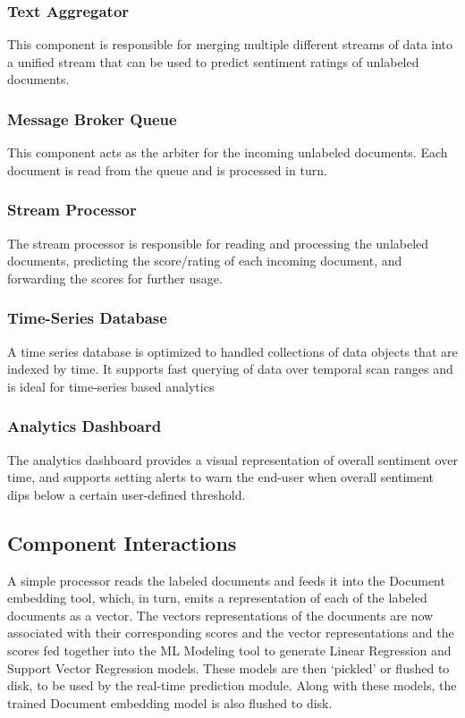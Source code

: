 \documentclass[conference]{IEEEtran}
\begin{document}
        \subsubsection{Text Aggregator}
        This component is responsible for merging multiple different streams of data into a unified stream that can be used to predict sentiment ratings of unlabeled documents.

        \subsubsection{Message Broker Queue}
        This component acts as the arbiter for the incoming unlabeled documents. 
        Each document is read from the queue and is processed in turn.

        \subsubsection{Stream Processor}
        The stream processor is responsible for reading and processing the unlabeled documents, predicting the score/rating of each incoming document, and forwarding the scores for further usage.

        \subsubsection{Time-Series Database}
        A time series database is optimized to handled collections of data objects that are indexed by time. 
        It supports fast querying of data over temporal scan ranges and is ideal for time-series based analytics

        \subsubsection{Analytics Dashboard}
        The analytics dashboard provides a visual representation of overall sentiment over time, and supports setting alerts to warn the end-user when overall sentiment dips below a certain user-defined threshold.

    \subsection{Component Interactions} \label{Component Interactions}
    A simple processor reads the labeled documents and feeds it into the Document embedding tool, which, in turn, emits a representation of each of the labeled documents as a vector.
    The vectors representations of the documents are now associated with their corresponding scores and the vector representations and the scores fed together into the ML Modeling tool to generate Linear Regression and Support Vector Regression models. 
    These models are then `pickled' or flushed to disk, to be used by the real-time prediction module. 
    Along with these models, the trained Document embedding model is also flushed to disk.
\end{document}
